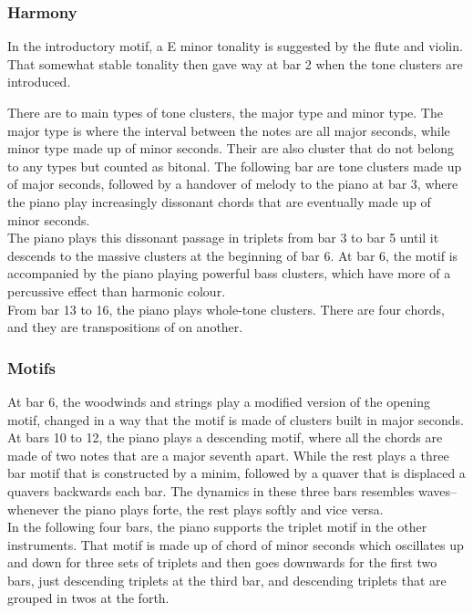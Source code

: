\documentclass{article}
\begin{document}
\subsubsection{Harmony}

In the introductory motif, a E minor tonality is suggested by the flute and
violin.  That somewhat stable tonality then gave way at bar 2 when
the tone clusters are introduced.

There are to main types of tone clusters, the major type and minor type.  The
major type is where the interval between the notes are all major seconds, while
minor type made up of minor seconds. Their are also cluster that do not belong
to any types but counted as bitonal. The following bar are tone clusters made
up of major seconds, followed by a handover of melody to the piano at bar 3,
where the piano play increasingly dissonant chords that are eventually made up
of minor seconds.\\

The piano plays this dissonant passage in triplets from bar 3 to bar 5 until it
descends to the massive clusters at the beginning of bar 6.  At bar 6, the
motif is accompanied by the piano playing powerful bass clusters, which have
more of a percussive effect than harmonic colour.\\

From bar 13 to 16, the piano plays whole-tone clusters. There are four chords,
and they are transpositions of on another.

\subsubsection{Motifs}

At bar 6, the woodwinds and strings play a modified version of the opening
motif, changed in a way that the motif is made of clusters built in major
seconds.  At bars 10 to 12, the piano plays a descending motif, where all the
chords are made of two notes that are a major seventh apart.  While the rest
plays a three bar motif that is constructed by a minim, followed by a quaver
that is displaced a quavers backwards each bar.  The dynamics in these three bars
resembles waves--whenever the piano plays forte, the rest plays softly and vice
versa.\\

In the following four bars, the piano supports the triplet motif in the other
instruments.  That motif is made up of chord of minor seconds which oscillates
up and down for three sets of triplets and then goes downwards for the first
two bars, just descending triplets at the third bar, and descending triplets
that are grouped in twos at the forth.\\
\end{document}
